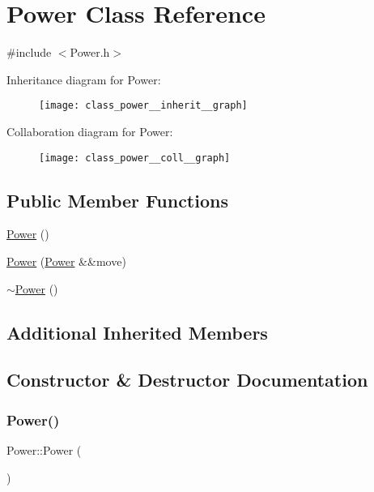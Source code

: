 \hypertarget{class_power}{}\section{Power Class Reference}
\label{class_power}


{\ttfamily \#include $<$Power.\+h$>$}



Inheritance diagram for Power\+:
\nopagebreak
\begin{figure}[H]
\begin{center}
\leavevmode
\texttt{[image: class\_power\_\_inherit\_\_graph]}
\end{center}
\end{figure}


Collaboration diagram for Power\+:
\nopagebreak
\begin{figure}[H]
\begin{center}
\leavevmode
\texttt{[image: class\_power\_\_coll\_\_graph]}
\end{center}
\end{figure}
\subsection*{Public Member Functions}
\begin{DoxyCompactItemize}
\item 
\mbox{\hyperlink{class_power_a909af60fdce9dbe98b5054f9c4917645}{Power}} ()
\item 
\mbox{\hyperlink{class_power_ab5523c6d03675f2e88a3fda5befc1285}{Power}} (\mbox{\hyperlink{class_power}{Power}} \&\&move)
\item 
\mbox{\hyperlink{class_power_a02fbe8faaab8776a6a43e979ad2c9a44}{$\sim$\+Power}} ()
\end{DoxyCompactItemize}
\subsection*{Additional Inherited Members}


\subsection{Constructor \& Destructor Documentation}
\mbox{\label{class_power_a909af60fdce9dbe98b5054f9c4917645}} 
\subsubsection{\texorpdfstring{Power()}{Power()}\hspace{0.1cm}{\footnotesize\ttfamily [1/2]}}
{\footnotesize\ttfamily Power\+::\+Power (\begin{DoxyParamCaption}{ }\end{DoxyParamCaption})}

